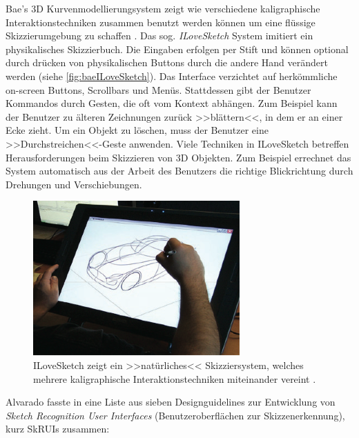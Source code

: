 \medskip Bae's 3D Kurvenmodellierungsystem zeigt wie verschiedene kaligraphische Interaktionstechniken zusammen benutzt werden können um eine flüssige Skizzierumgebung zu schaffen \citep{Bae:2008}. Das sog. \emph{ILoveSketch} System imitiert ein physikalisches Skizzierbuch. Die Eingaben erfolgen per Stift und können optional durch drücken von physikalischen Buttons durch die andere Hand verändert werden (siehe \autoref{fig:baeILoveSketch}). Das Interface verzichtet auf herkömmliche on-screen Buttons, Scrollbars und Menüs. Stattdessen gibt der Benutzer Kommandos durch Gesten, die oft vom Kontext abhängen. Zum Beispiel kann der Benutzer zu älteren Zeichnungen zurück >>blättern<<, in dem er an einer Ecke zieht. Um ein Objekt zu löschen, muss der Benutzer eine >>Durchstreichen<<-Geste anwenden. Viele Techniken in ILoveSketch betreffen Herausforderungen beim Skizzieren von 3D Objekten. Zum Beispiel errechnet das System automatisch aus der Arbeit des Benutzers die richtige Blickrichtung durch Drehungen und Verschiebungen.

\begin{figure}[bth]
	\begin{center}
	
	\includegraphics[width=0.7\linewidth]{gfx/baeILoveSketch}
	\caption[ILoveSketch \newline \citep{Johnson:2009}]{ILoveSketch zeigt ein >>natürliches<< Skizziersystem, welches mehrere kaligraphische Interaktionstechniken miteinander vereint \citep{Bae:2008}.}
	\label{fig:baeILoveSketch}
	\end{center}
\end{figure}

Alvarado fasste in \citep{Alvorado:2004} eine Liste aus sieben Designguidelines zur Entwicklung von \emph{Sketch Recognition User Interfaces} (Benutzeroberflächen zur Skizzenerkennung), kurz SkRUIs zusammen: 

